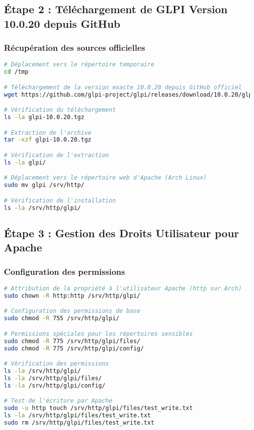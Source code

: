 \documentclass[12pt,a4paper]{article}
\begin{document}
\subsection{Étape 2 : Téléchargement de GLPI Version 10.0.20 depuis GitHub}

\subsubsection{Récupération des sources officielles}
\begin{lstlisting}[language=bash, caption=Téléchargement GLPI 10.0.20]
# Déplacement vers le répertoire temporaire
cd /tmp

# Téléchargement de la version exacte 10.0.20 depuis GitHub officiel
wget https://github.com/glpi-project/glpi/releases/download/10.0.20/glpi-10.0.20.tgz

# Vérification du téléchargement
ls -la glpi-10.0.20.tgz

# Extraction de l'archive
tar -xzf glpi-10.0.20.tgz

# Vérification de l'extraction
ls -la glpi/

# Déplacement vers le répertoire web d'Apache (Arch Linux)
sudo mv glpi /srv/http/

# Vérification de l'installation
ls -la /srv/http/glpi/
\end{lstlisting}

\subsection{Étape 3 : Gestion des Droits Utilisateur pour Apache}

\subsubsection{Configuration des permissions}
\begin{lstlisting}[language=bash, caption=Attribution des droits Apache]
# Attribution de la propriété à l'utilisateur Apache (http sur Arch)
sudo chown -R http:http /srv/http/glpi/

# Configuration des permissions de base
sudo chmod -R 755 /srv/http/glpi/

# Permissions spéciales pour les répertoires sensibles
sudo chmod -R 775 /srv/http/glpi/files/
sudo chmod -R 775 /srv/http/glpi/config/

# Vérification des permissions
ls -la /srv/http/glpi/
ls -la /srv/http/glpi/files/
ls -la /srv/http/glpi/config/

# Test de l'écriture par Apache
sudo -u http touch /srv/http/glpi/files/test_write.txt
ls -la /srv/http/glpi/files/test_write.txt
sudo rm /srv/http/glpi/files/test_write.txt
\end{lstlisting}
\end{document}
